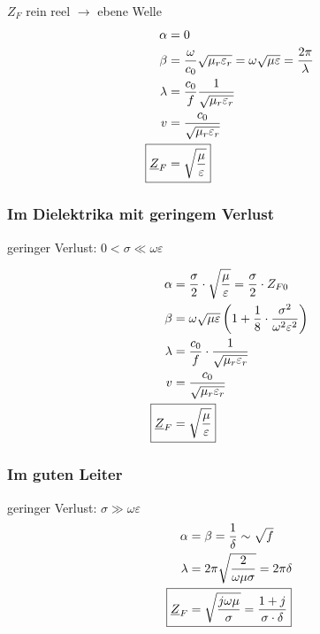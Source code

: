 $Z_F$ rein reel $\rightarrow$ ebene Welle
\begin{align*}
    \alpha                  & = 0                                                                                              \\
    \beta                   & = \dfrac{\omega}{c_0}\sqrt{\mu_r\varepsilon_r}=\omega\sqrt{\mu\varepsilon}=\dfrac{2\pi}{\lambda} \\
    \lambda                 & = \dfrac{c_0}{f}\dfrac{1}{\sqrt{\mu_r\varepsilon_r}}                                             \\
    v                       & = \dfrac{c_0}{\sqrt{\mu_r\varepsilon_r}}                                                         \\
    \Aboxed{\underline{Z}_F & = \sqrt{\dfrac{\mu}{\varepsilon}}}
\end{align*}

\subsubsection{Im Dielektrika mit geringem Verlust}
geringer Verlust: $0 < \sigma \ll\omega\varepsilon$

\begin{align*}
    \alpha                  & = \dfrac{\sigma}{2}\cdot\sqrt{\dfrac{\mu}{\varepsilon}} = \frac{\sigma}{2}\cdot Z_{F0}               \\
    \beta                   & = \omega\sqrt{\mu\varepsilon}\left(1+\dfrac{1}{8}\cdot\dfrac{\sigma^2}{\omega^2\varepsilon^2}\right) \\
    \lambda                 & = \dfrac{c_0}{f}\cdot\dfrac{1}{\sqrt{\mu_r\varepsilon_r}}                                            \\
    v                       & = \dfrac{c_0}{\sqrt{\mu_r\varepsilon_r}}                                                             \\
    \Aboxed{\underline{Z}_F & = \sqrt{\dfrac{\mu}{\varepsilon}}}
\end{align*}

\subsubsection{Im guten Leiter}
geringer Verlust: $\sigma \gg\omega\varepsilon$
\begin{align*}
    \alpha                  & = \beta = \dfrac{1}{\delta} \sim \sqrt{f}                             \\
    \lambda                 & = 2\pi \sqrt{\dfrac{2}{\omega\mu\sigma}}=2\pi\delta                   \\
    \Aboxed{\underline{Z}_F & = \sqrt{\dfrac{j\omega\mu}{\sigma}} = \dfrac{1+j}{\sigma\cdot\delta}}
\end{align*}

